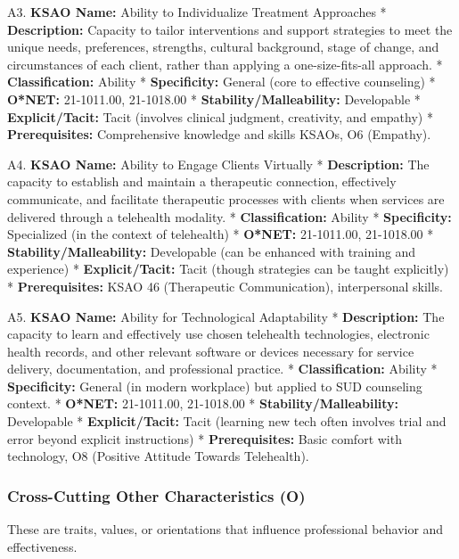 \documentclass[
  letterpaper,
  DIV=11,
  numbers=noendperiod]{scrartcl}
\begin{document}
A3. \textbf{KSAO Name:} Ability to Individualize Treatment Approaches *
\textbf{Description:} Capacity to tailor interventions and support
strategies to meet the unique needs, preferences, strengths, cultural
background, stage of change, and circumstances of each client, rather
than applying a one-size-fits-all approach. * \textbf{Classification:}
Ability * \textbf{Specificity:} General (core to effective counseling) *
\textbf{O*NET:} 21-1011.00, 21-1018.00 *
\textbf{Stability/Malleability:} Developable * \textbf{Explicit/Tacit:}
Tacit (involves clinical judgment, creativity, and empathy) *
\textbf{Prerequisites:} Comprehensive knowledge and skills KSAOs, O6
(Empathy).

A4. \textbf{KSAO Name:} Ability to Engage Clients Virtually *
\textbf{Description:} The capacity to establish and maintain a
therapeutic connection, effectively communicate, and facilitate
therapeutic processes with clients when services are delivered through a
telehealth modality. * \textbf{Classification:} Ability *
\textbf{Specificity:} Specialized (in the context of telehealth) *
\textbf{O*NET:} 21-1011.00, 21-1018.00 *
\textbf{Stability/Malleability:} Developable (can be enhanced with
training and experience) * \textbf{Explicit/Tacit:} Tacit (though
strategies can be taught explicitly) * \textbf{Prerequisites:} KSAO 46
(Therapeutic Communication), interpersonal skills.

A5. \textbf{KSAO Name:} Ability for Technological Adaptability *
\textbf{Description:} The capacity to learn and effectively use chosen
telehealth technologies, electronic health records, and other relevant
software or devices necessary for service delivery, documentation, and
professional practice. * \textbf{Classification:} Ability *
\textbf{Specificity:} General (in modern workplace) but applied to SUD
counseling context. * \textbf{O*NET:} 21-1011.00, 21-1018.00 *
\textbf{Stability/Malleability:} Developable * \textbf{Explicit/Tacit:}
Tacit (learning new tech often involves trial and error beyond explicit
instructions) * \textbf{Prerequisites:} Basic comfort with technology,
O8 (Positive Attitude Towards Telehealth).

\subsubsection{Cross-Cutting Other Characteristics
(O)}\label{cross-cutting-other-characteristics-o}

These are traits, values, or orientations that influence professional
behavior and effectiveness.
\end{document}
